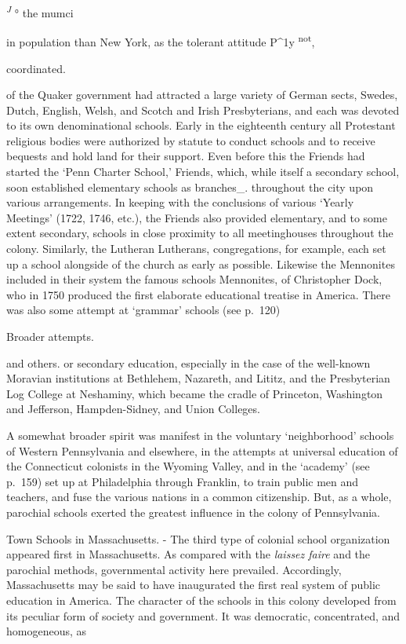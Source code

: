 \documentclass[]{book}
\begin{document}
\emph{\textsuperscript{J}} ° the mumci

in population than New York, as the tolerant attitude P\^{}1y \textsuperscript{not},

coordinated.

of the Quaker government had attracted a large variety of German sects, Swedes, Dutch, English, Welsh, and Scotch and Irish Presbyterians, and each was devoted to its own denominational schools. Early in the eighteenth century all Protestant religious bodies were authorized by statute to conduct schools and to receive bequests and hold land for their support. Even before this the Friends had started the `Penn Charter School,' Friends, which, while itself a secondary school, soon established elementary schools as branches\_. throughout the city upon various arrangements. In keeping with the conclusions of various `Yearly Meetings' (1722, 1746, etc.), the Friends also provided elementary, and to some extent secondary, schools in close proximity to all meetinghouses throughout the colony. Similarly, the Lutheran Lutherans, congregations, for example, each set up a school alongside of the church as early as possible. Likewise the Mennonites included in their system the famous schools Mennonites, of Christopher Dock, who in 1750 produced the first elaborate educational treatise in America. There was also some attempt at `grammar' schools (see p.~120)

Broader attempts.

and others. or secondary education, especially in the case of the well-known Moravian institutions at Bethlehem, Nazareth, and Lititz, and the Presbyterian Log College at Neshaminy, which became the cradle of Princeton, Washington and Jefferson, Hampden-Sidney, and Union Colleges.

A somewhat broader spirit was manifest in the voluntary `neighborhood' schools of Western Pennsylvania and elsewhere, in the attempts at universal education of the Connecticut colonists in the Wyoming Valley, and in the `academy' (see p.~159) set up at Philadelphia through Franklin, to train public men and teachers, and fuse the various nations in a common citizenship. But, as a whole, parochial schools exerted the greatest influence in the colony of Pennsylvania.

Town Schools in Massachusetts. - The third type of colonial school organization appeared first in Massachusetts. As compared with the \emph{laissez faire} and the parochial methods, governmental activity here prevailed. Accordingly, Massachusetts may be said to have inaugurated the first real system of public education in America. The character of the schools in this colony developed from its peculiar form of society and government. It was democratic, concentrated, and homogeneous, as
\end{document}
